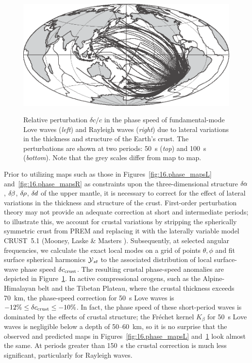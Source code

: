 \begin{figure}
\begin{center}
{
\includegraphics{../figures/chap16/fig07.eps}
}
\end{center}
\caption[crustal]{
Relative perturbation $\delta c/c$ in the phase speed
of fundamental-mode Love waves ({\em left\/}) and
Rayleigh waves ({\em right\/}) due to lateral variations
in the thickness and structure of the Earth's crust.
The perturbations are shown at two periods: 50~s
({\em top\/}) and 100~s ({\em bottom\/}). Note that
the grey scales differ from map to map.
}
\label{fig:16.crustal}
\end{figure}

Prior to utilizing maps such as those in Figures~\ref{fig:16.phase_mapsL}
and~\ref{fig:16.phase_mapsR} as constraints upon the three-dimensional
structure $\delta\hspace{-0.1 mm}\alpha$, $\delta\hspace{-0.2 mm}\beta$,
$\delta\hspace{-0.2 mm}\rho$, $\delta\hspace{-0.1 mm}d$ of the upper
mantle, it is necessary to correct for the effect of lateral variations
%
in the thickness and structure of the crust.  First-order perturbation
theory may not provide an adequate correction at short and intermediate
periods; to illustrate this, we account for crustal variations by stripping
the spherically symmetric crust from PREM and replacing it with the laterally
variable model CRUST~5.1 (Mooney, Laske \& Masters \citeyear{mooney&al98}).
Subsequently, at selected angular frequencies, we calculate the exact local
modes on a grid of points $\theta,\phi$ and fit surface spherical harmonics
$\mbox{$\cal Y$}_{st}$ to the associated distribution of local surface-wave phase speed
$\delta c_{\rm crust}$.  The resulting crustal phase-speed anomalies are
depicted in Figure~\ref{fig:16.crustal}. In active compressional orogens,
such as the Alpine-Himalayan belt and the Tibetan Plateau, where the
crustal thickness exceeds 70~km, the phase-speed correction for 50~s
Love waves is $-12\%\leq\delta c_{\rm crust}\leq-10\%$. 
In fact, the phase speed of these short-period waves is dominated by
the effects of crustal structure; the Fr\'{e}chet kernel
$K_{\beta}$ for 50~s Love waves
is negligible below a depth of 50--60~km, so it is no surprise that
the observed and predicted maps in
Figures~\ref{fig:16.phase_mapsL} and~\ref{fig:16.crustal} look almost the same.
At periods greater than 150~s the crustal correction is much less significant,
particularly for Rayleigh waves.


